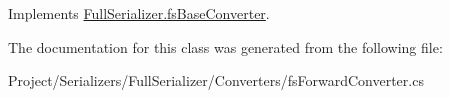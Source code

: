 Implements \hyperlink{class_full_serializer_1_1fs_base_converter_aeb0065770e53ecaac3f5dd3b5cd670d1}{Full\+Serializer.\+fs\+Base\+Converter}.



The documentation for this class was generated from the following file\+:\begin{DoxyCompactItemize}
\item 
Project/\+Serializers/\+Full\+Serializer/\+Converters/fs\+Forward\+Converter.\+cs\end{DoxyCompactItemize}

